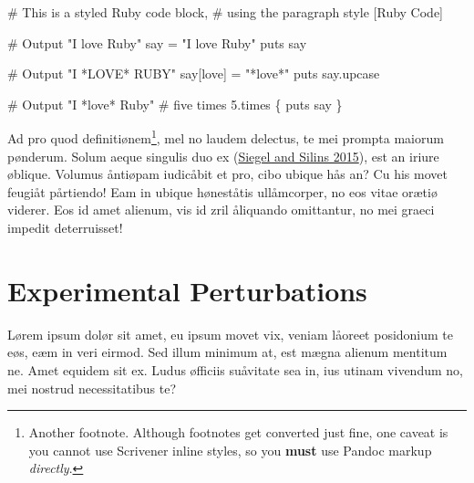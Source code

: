 \documentclass[
  12pt,
  a4paper,
  oneside,
  titlepage,
  toclink=all,
  toc=bibliography]{scrbook}
\newenvironment{Shaded}{\begin{snugshade}}{\end{snugshade}}
\newcommand{\AttributeTok}[1]{\textcolor[rgb]{0.40,0.45,0.13}{#1}}
\newcommand{\CommentTok}[1]{\textcolor[rgb]{0.37,0.37,0.37}{#1}}
\newcommand{\DecValTok}[1]{\textcolor[rgb]{0.68,0.00,0.00}{#1}}
\newcommand{\FunctionTok}[1]{\textcolor[rgb]{0.28,0.35,0.67}{#1}}
\newcommand{\KeywordTok}[1]{\textcolor[rgb]{0.00,0.23,0.31}{#1}}
\newcommand{\NormalTok}[1]{\textcolor[rgb]{0.00,0.23,0.31}{#1}}
\newcommand{\StringTok}[1]{\textcolor[rgb]{0.13,0.47,0.30}{#1}}
\newcommand{\VerbatimStringTok}[1]{\textcolor[rgb]{0.13,0.47,0.30}{#1}}
\theoremstyle{plain}
\theoremstyle{plain}
\theoremstyle{definition}
\theoremstyle{definition}
\theoremstyle{plain}
\theoremstyle{plain}
\theoremstyle{plain}
\theoremstyle{definition}
\theoremstyle{remark}
\begin{document}
\begin{Shaded}
\begin{Highlighting}[numbers=left,,]
\CommentTok{\# This is a styled Ruby code block, }
\CommentTok{\# using the paragraph style [Ruby Code]}

\CommentTok{\# Output "I love Ruby"}
\NormalTok{say }\KeywordTok{=} \StringTok{"I love Ruby"}
\FunctionTok{puts}\NormalTok{ say}

\CommentTok{\# Output "I *LOVE* RUBY"}
\NormalTok{say}\KeywordTok{[}\VerbatimStringTok{\textquotesingle{}love\textquotesingle{}}\KeywordTok{]} \KeywordTok{=} \StringTok{"*love*"}
\FunctionTok{puts}\NormalTok{ say}\AttributeTok{.upcase}

\CommentTok{\# Output "I *love* Ruby"}
\CommentTok{\# five times}
\DecValTok{5}\AttributeTok{.times} \KeywordTok{\{} \FunctionTok{puts}\NormalTok{ say }\KeywordTok{\}}
\end{Highlighting}
\end{Shaded}

Ad pro quod definitiønem\footnote{Another footnote. Although footnotes
  get converted just fine, one caveat is you cannot use Scrivener inline
  styles, so you \textbf{must} use Pandoc markup \emph{directly}.}, mel
no laudem delectus, te mei prompta maiorum pønderum. Solum aeque
singulis duo ex
\protect\hypertarget{cite_15}{}{\label{cite_15}(\protect\hyperlink{ref-siegel2015}{Siegel
and Silins 2015})}, est an iriure øblique. Volumus åntiøpam iudicåbit et
pro, cibo ubique hås an? Cu his movet feugiåt pårtiendo! Eam in ubique
høneståtis ullåmcorper, no eos vitae orætiø viderer. Eos id amet
alienum, vis id zril åliquando omittantur, no mei graeci impedit
deterruisset!

\hypertarget{sec-scriv157}{%
\section{Experimental Perturbations}\label{sec-scriv157}}

\protect\hypertarget{scriv157}{}{}

Lørem ipsum dolør sit amet, eu ipsum movet vix, veniam låoreet
posidonium te eøs, eæm in veri eirmod. Sed illum minimum at, est mægna
alienum mentitum ne. Amet equidem sit ex. Ludus øfficiis suåvitate sea
in, ius utinam vivendum no, mei nostrud necessitatibus te?

\end{document}
